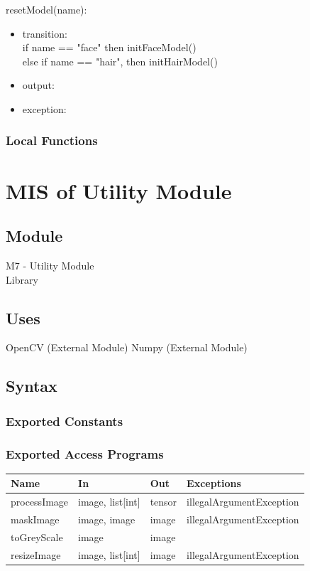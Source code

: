 \documentclass[12pt, titlepage]{article}
\begin{document}
\noindent resetModel(name):
\begin{itemize}
\item transition: \\
if name == "face" then initFaceModel() \\
else if name == "hair", then initHairModel()
\item output: 
\item exception: 
\end{itemize}

\subsubsection{Local Functions}

\newpage
\section{MIS of Utility Module}
\subsection{Module}
M7 - Utility Module\\
Library

\subsection{Uses}
OpenCV (External Module)
Numpy (External Module)

\subsection{Syntax}

\subsubsection{Exported Constants}
\subsubsection{Exported Access Programs}

\begin{center}
\begin{tabular}{p{4cm} p{3cm} p{4cm} p{4cm}}
\hline
\textbf{Name} & \textbf{In} & \textbf{Out} & \textbf{Exceptions} \\
\hline
processImage & image, list[int] & tensor & illegalArgumentException \\
maskImage & image, image & image  & illegalArgumentException \\
toGreyScale & image & image & \\
resizeImage & image, list[int] & image & illegalArgumentException \\
\hline
\end{tabular}
\end{center}
\end{document}
